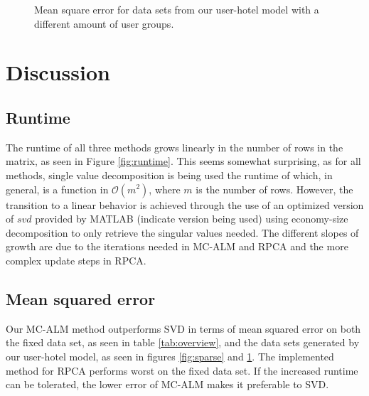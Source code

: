 \documentclass[10pt,conference,compsocconf]{IEEEtran}
\begin{document}
\begin{figure}
\caption{Mean square error for data sets from our user-hotel model with a different amount of user groups.}
\label{fig:usergroups}
\end{figure}


\section{Discussion}

\subsection{Runtime}
The runtime of all three methods grows linearly in the number of rows in the
matrix, as seen in Figure \ref{fig:runtime}. This seems somewhat surprising, as
for all methods, single value decomposition is being used the runtime of which,
in general, is a function in $\mathcal{O}(m^2)$, where $m$ is the number of
rows. However, the transition to a linear behavior is achieved through the use
of an optimized version of $svd$ provided by MATLAB (indicate version being
used) using economy-size decomposition to only retrieve the singular values
needed. The different slopes of growth are due to the iterations needed in
MC-ALM and RPCA and the more complex update steps in RPCA.

\subsection{Mean squared error}
Our MC-ALM method outperforms SVD in terms of mean squared error on both the
fixed data set, as seen in table \ref{tab:overview}, and the data sets
generated by our user-hotel model, as seen in figures \ref{fig:sparse} and
\ref{fig:usergroups}. The implemented method for RPCA performs worst on the
fixed data set. If the increased runtime can be tolerated, the lower error of
MC-ALM makes it preferable to SVD.
\\
\end{document}
